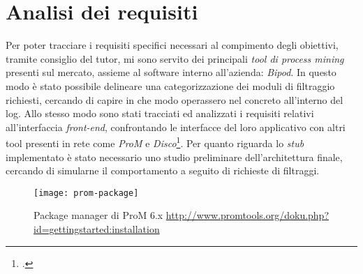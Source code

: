 \section{Analisi dei requisiti}
Per poter tracciare i requisiti specifici necessari al compimento degli obiettivi, tramite consiglio del tutor, mi sono servito dei principali \textit{tool di process mining} presenti sul mercato, assieme al software interno all'azienda: \textit{Bipod}. In questo modo è stato possibile delineare una categorizzazione dei moduli di filtraggio richiesti, cercando di capire in che modo operassero nel concreto all'interno del log. Allo stesso modo sono stati tracciati ed analizzati i requisiti relativi all'interfaccia \textit{front-end}, confrontando le interfacce del loro applicativo con altri tool presenti in rete come \textit{ProM} e \textit{\gls{Disco}}\footcite{Disco: https://fluxicon.com/disco/}. Per quanto riguarda lo \textit{stub} implementato è stato necessario uno studio preliminare dell'architettura finale, cercando di simularne il comportamento a seguito di richieste di filtraggi. 
\begin{figure}[!h] 
	\centering 
	\texttt{[image: prom-package]} 
	\caption{Package manager di ProM 6.x \url{http://www.promtools.org/doku.php?id=gettingstarted:installation}}
\end{figure}

